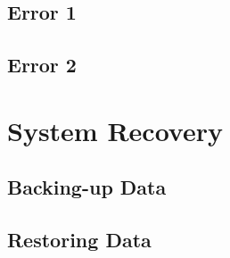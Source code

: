 \subsection{Error 1}

\subsection{Error 2}

\section{System Recovery}

\subsection{Backing-up Data}

\subsection{Restoring Data}
